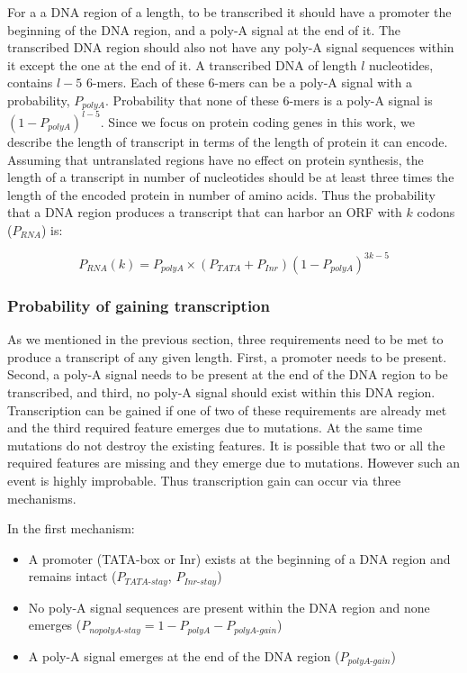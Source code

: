 \documentclass[12pt,a4paper]{article}
\begin{document}
For a a DNA region of a length, to be transcribed it should have a promoter the beginning of the DNA region, and a poly-A signal at the end of it. The transcribed DNA region should also not have any poly-A signal sequences within it except the one at the end of it. A transcribed DNA of length $l$ nucleotides, contains $l-5$ 6-mers. Each of these 6-mers can be a poly-A signal with a probability, $P_\textit{polyA}$. Probability that none of these 6-mers is a poly-A signal is $(1-P_\textit{polyA})^{l-5}$. Since we focus on protein coding genes in this work, we describe the length of transcript in terms of the length of protein it can encode. Assuming that untranslated regions have no effect on protein synthesis, the length of a transcript in number of nucleotides should be at least three times the length of the encoded protein in number of amino acids. Thus the probability that a DNA region produces a transcript that can harbor an ORF with $k$ codons ($P_\textit{RNA}$) is:

\begin{equation}
P_\textit{RNA}(k) = P_\textit{polyA} \times (P_\textit{TATA} + P_\textit{Inr}) (1-P_\textit{polyA})^{3k-5}
\label{eqrnaprob}
\end{equation}

\subsubsection{Probability of gaining transcription}

As we mentioned in the previous section, three requirements need to be met to produce a transcript of any given length. First, a promoter needs to be present. Second, a poly-A signal needs to be present at the end of the DNA region to be transcribed, and third, no poly-A signal should exist within this DNA region. Transcription can be gained if one of two of these requirements are already met and the third required feature emerges due to mutations. At the same time mutations do not destroy the existing features. It is possible that two or all the required features are missing and they emerge due to mutations. However such an event is highly improbable. Thus transcription gain can occur via three mechanisms.

\vspace{\baselineskip}
In the first mechanism:
\begin{itemize}
\item A promoter (TATA-box or Inr) exists at the beginning of a DNA region and remains intact ($P_\textit{TATA-stay}$, $P_\textit{Inr-stay}$)
\item No poly-A signal sequences are present within the DNA region and none emerges ($P_\textit{nopolyA-stay} = 1 - P_\textit{polyA} - P_\textit{polyA-gain}$)
\item A poly-A signal emerges at the end of the DNA region ($P_\textit{polyA-gain}$)
\end{itemize}
\end{document}
